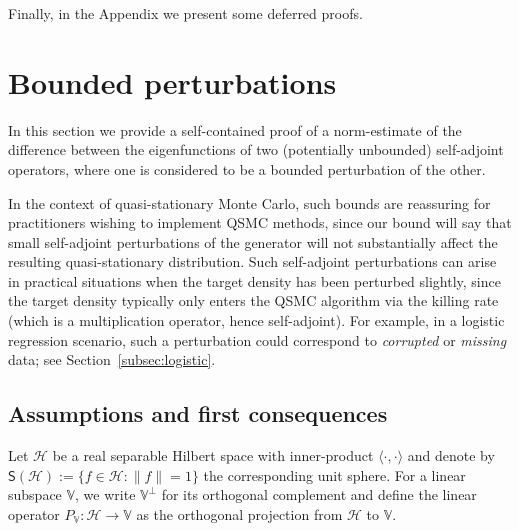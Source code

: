 \documentclass{aptpub}
\renewcommand{\H}{\mathcal H}
\begin{document}
Finally, in the Appendix we present some deferred proofs.




\section{Bounded perturbations}
\label{sec:bdd_pert}

In this section we provide a self-contained proof of a norm-estimate of the difference between the eigenfunctions of two (potentially unbounded) self-adjoint operators, where one is considered to be a bounded perturbation of the other.  


In the context of quasi-stationary Monte Carlo, such bounds are reassuring for practitioners wishing to implement QSMC methods, since our bound will say that small self-adjoint perturbations of the generator will not substantially affect the resulting quasi-stationary distribution.
Such self-adjoint perturbations can arise in practical situations when the target density has been perturbed slightly, since the target density typically only enters the QSMC algorithm via the killing rate (which is a multiplication operator, hence self-adjoint). For example, in a logistic regression scenario, such a perturbation could correspond to \textit{corrupted} or \textit{missing} data; see Section~\ref{subsec:logistic}.


\subsection{Assumptions and first consequences}
Let $\mathcal{H}$ be a real separable Hilbert space with inner-product $\langle\cdot,\cdot\rangle$  and denote by $\mathsf S(\H):=\{f\in\H:\|f\|=1\}$ the corresponding unit sphere. For a linear subspace $\mathbb V$, we write $\mathbb V^\perp$ for its orthogonal complement and define the linear operator $P_{\mathbb{V}}\colon \mathcal{H} \to \mathbb{V}$ as the orthogonal projection from $\mathcal{H}$ to $\mathbb{V}$.
\end{document}
